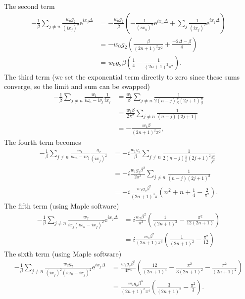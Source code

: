 \documentclass[12pt,a4paper]{scrartcl}
\numberwithin{equation}{section}
\begin{document}
The second term
\begin{align}
-\frac{1}{\beta} \sum_{j\neq n}  \frac{w_0 g_2}{(ix_j)^2} \mathrm{e}^{ix_j \Delta} 
&= -\frac{w_0 g_2}{\beta}\left(- \frac{1}{(ix_n)^2} \mathrm{e}^{ix_n \Delta}   + \sum_{j}  \frac{1}{(ix_j)^2} \mathrm{e}^{ix_j \Delta}\right)   \\
&= -w_0 g_2\left( \frac{\beta}{(2n+1)^2\pi^2} + \frac{-2\Delta-\beta}{4} \right)   \\
&=  w_0 g_2\beta\left( \frac{1}{4} -\frac{1}{(2n+1)^2\pi^2} \right) .
\end{align}
The third term
(we set the exponential term directly to zero since these sums converge, so the limit and sum can be
swapped)
\begin{align}
-\frac{1}{\beta} \sum_{j\neq n}  \frac{w_1}{i\omega_n-i\nu_j} \frac{1}{ix_j} 
&= \frac{w_1}{\beta} \sum_{j\neq n}  \frac{1}{2(n-j)\frac{\pi}{\beta} (2j+1)\frac{\pi}{\beta}} \\
&= \frac{w_1\beta}{2\pi^2} \sum_{j\neq n}  \frac{1}{(n-j)(2j+1)} \\
&= -\frac{ w_1 \beta }{(2n+1)^2 \pi^2} ,
\end{align}
The fourth term becomes
\begin{align}
-\frac{1}{\beta} \sum_{j\neq n}  \frac{w_1}{i\omega_n-i\nu_j} \frac{g_2}{(ix_j)^2} 
&= -i\frac{w_1g_2}{\beta} \sum_{j\neq n}  \frac{1}{2(n-j)\frac{\pi}{\beta} (2j+1)^2\frac{\pi^2}{\beta^2}} \\
&= -i\frac{w_1 g_2 \beta^2}{2\pi^3} \sum_{j\neq n}  \frac{1}{(n-j)(2j+1)^2} \\
&= -i\frac{w_1 g_2 \beta^2}{(2n+1)^3 \pi} \left( n^2 + n + \frac{1}{4} - \frac{2}{\pi^2} \right).
\end{align}
The fifth term (using Maple software)
\begin{align}
-\frac{1}{\beta} \sum_{j\neq n}  \frac{w_2}{ix_j(i\omega_n -ix_j)^2} \mathrm{e}^{ix_j \Delta} 
&= i\frac{w_2\beta^2}{\pi^3}\left( \frac{1}{(2n+1)^3} - \frac{\pi^2}{12(2n+1)} \right) \\
&= i\frac{w_2\beta^2}{(2n+1)\pi^3}\left( \frac{1}{(2n+1)^2} - \frac{\pi^2}{12} \right) 
\end{align}
The sixth term (using Maple software)
\begin{align}
-\frac{1}{\beta} \sum_{j\neq n}  \frac{w_2g_2}{(ix_j)^2 (i\omega_n -ix_j)^2} \mathrm{e}^{ix_j \Delta} 
&= \frac{w_2g_2\beta^3}{4\pi^4}\left( \frac{12}{(2n+1)^4} - \frac{\pi^2}{3(2n+1)^2} - \frac{\pi^2}{(2n+1)^2} \right) \\
&= \frac{w_2g_2\beta^3}{(2n+1)^2\pi^4}\left( \frac{3}{(2n+1)^2} - \frac{\pi^2}{3} \right).
\end{align}
\end{document}
